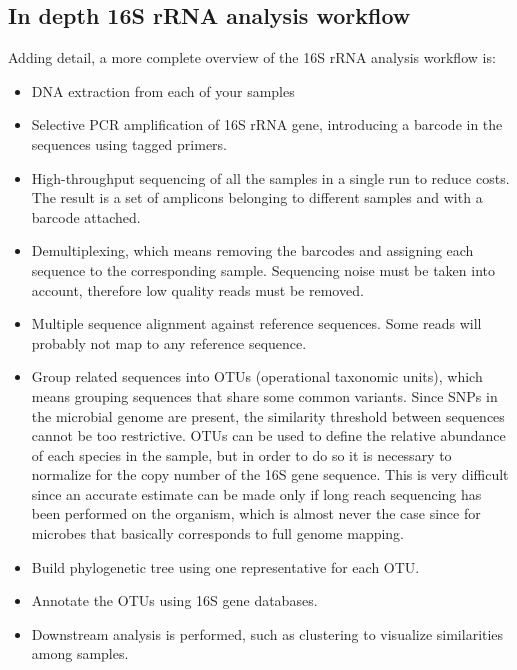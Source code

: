   \subsection{In depth 16S rRNA analysis workflow}
  Adding detail, a more complete overview of the 16S rRNA analysis workflow is:

  \begin{multicols}{2}
    \begin{itemize}
      \item DNA extraction from each of your samples
      \item Selective PCR amplification of 16S rRNA gene, introducing a barcode in the sequences using tagged primers.
      \item High-throughput sequencing of all the samples in a single run to reduce costs.
        The result is a set of amplicons belonging to different samples and with a barcode attached.
      \item Demultiplexing, which means removing the barcodes and assigning each sequence  to the corresponding sample.
        Sequencing noise must be taken into account, therefore low quality reads must be removed.
      \item Multiple sequence alignment against reference sequences.
        Some reads will probably not map to any reference sequence.
      \item Group related sequences into OTUs (operational taxonomic units), which means grouping sequences that share some common variants.
        Since SNPs in the microbial genome are present, the similarity threshold between sequences cannot be too restrictive.
        OTUs can be used to define the relative abundance of each species in the sample, but in order to do so it is necessary to normalize for the copy number of the 16S gene sequence.
        This is very difficult since an accurate estimate can be made only if long reach sequencing has been performed on the organism, which is almost never the case since for microbes that basically corresponds to full genome mapping.
      \item Build phylogenetic tree using one representative for each OTU.
      \item Annotate the OTUs using 16S gene databases.
      \item Downstream analysis is performed, such as clustering to visualize similarities among samples.
    \end{itemize}
  \end{multicols}

